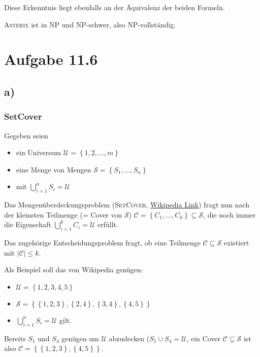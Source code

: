 \documentclass{article}
\begin{document}
Diese Erkenntnis liegt ebenfalls an der Äquivalenz der beiden Formeln.

\bigskip

\textsc{Asterix} ist in NP und NP-schwer, also NP-vollständig.



\section*{Aufgabe 11.6}
\subsection*{a)}
\subsubsection*{SetCover}
Gegeben seien
\begin{itemize}
	\item ein Universum $\mathcal{U} = \left\{1, 2, \dots, m\right\}$
  \item eine Menge von Mengen $\mathcal{S} = \left\{S_1, \dots, S_n\right\}$
  \item mit $\bigcup\limits_{i=1}^n S_i = \mathcal{U}$
\end{itemize}

Das Mengenüberdeckungsproblem (\textsc{SetCover}, \href{http://en.wikipedia.org/wiki/Set_cover_problem}{Wikipedia Link}) fragt nun nach der kleinsten Teilmenge (= Cover von $\mathcal{S}$) $\mathcal{C} = \left\{C_1, \dots, C_k\right\} \subseteq \mathcal{S}$, die noch immer die Eigenschaft $\bigcup\limits_{i=1}^k C_i = \mathcal{U}$ erfüllt.

Das zugehörige Entscheidungsproblem fragt, ob eine Teilmenge $\mathcal{C} \subseteq \mathcal{S}$ existiert mit $|\mathcal{C}| \leq k$.

Als Beispiel soll das von Wikipedia genügen:
\begin{itemize}
	\item $\mathcal{U} = \left\{1, 2, 3, 4, 5\right\}$
  \item $\mathcal{S} = \left\{ \left\{ 1, 2, 3 \right\}, \left\{ 2, 4 \right\}, \left\{ 3, 4 \right\}, \left\{ 4, 5 \right\} \right\}$
  \item $\bigcup\limits_{i=1}^n S_i = \mathcal{U}$ gilt.
\end{itemize}
Bereits $S_1$ und $S_4$ genügen um $\mathcal{U}$ abzudecken ($S_1 \cup S_4 = \mathcal{U}$, ein Cover $\mathcal{C} \subseteq \mathcal{S}$ ist also $\mathcal{C} = \left\{ \left\{ 1, 2, 3 \right\}, \left\{ 4, 5 \right\} \right\}$.
\end{document}

